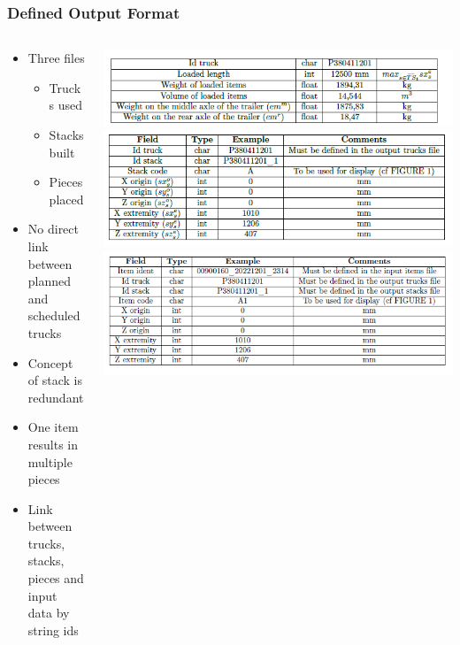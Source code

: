 \documentclass[dvipsnames,aspectratio=169]{beamer}
\begin{document}
\begin{frame}
\frametitle{Defined Output Format}
\begin{columns}
\begin{column}{0.5\textwidth}
\begin{itemize}
\item Three files
\begin{itemize}
\item Trucks used
\item Stacks built
\item Pieces placed
\end{itemize}
\item No direct link between planned and scheduled trucks
\item Concept of stack is redundant
\item One item results in multiple pieces
\item Link between trucks, stacks, pieces and input data by string ids
\end{itemize}
\end{column}
\begin{column}{0.5\textwidth}
\includegraphics[width=\textwidth]{images/roadefresulttrucks}
\includegraphics[width=\textwidth]{images/roadefresultstacks}
\includegraphics[width=\textwidth]{images/roadefresultitems}
\end{column}
\end{columns}
\end{frame}
\end{document}
